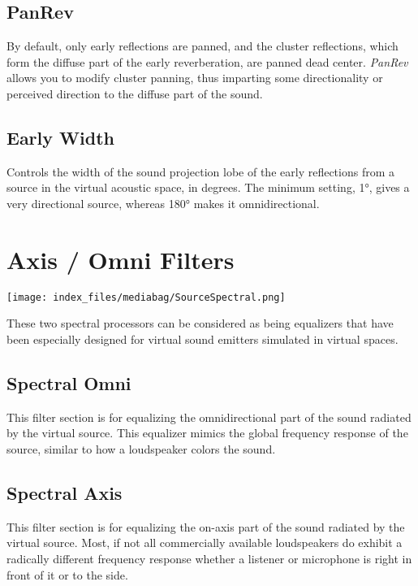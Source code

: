 \documentclass[
  letterpaper,
  DIV=11,
  numbers=noendperiod]{scrreport}
\begin{document}
\hypertarget{panrev}{%
\subsection{PanRev}\label{panrev}}

By default, only early reflections are panned, and the cluster
reflections, which form the diffuse part of the early reverberation, are
panned dead center. \emph{PanRev} allows you to modify cluster panning,
thus imparting some directionality or perceived direction to the diffuse
part of the sound.

\hypertarget{early-width}{%
\subsection{Early Width}\label{early-width}}

Controls the width of the sound projection lobe of the early reflections
from a source in the virtual acoustic space, in degrees. The minimum
setting, 1°, gives a very directional source, whereas 180° makes it
omnidirectional.

\hypertarget{axis-omni-filters}{%
\section{Axis / Omni Filters}\label{axis-omni-filters}}

\texttt{[image: index\_files/mediabag/SourceSpectral.png]}

These two spectral processors can be considered as being equalizers that
have been especially designed for virtual sound emitters simulated in
virtual spaces.

\hypertarget{spectral-omni}{%
\subsection{Spectral Omni}\label{spectral-omni}}

This filter section is for equalizing the omnidirectional part of the
sound radiated by the virtual source. This equalizer mimics the global
frequency response of the source, similar to how a loudspeaker colors
the sound.

\hypertarget{spectral-axis}{%
\subsection{Spectral Axis}\label{spectral-axis}}

This filter section is for equalizing the on-axis part of the sound
radiated by the virtual source. Most, if not all commercially available
loudspeakers do exhibit a radically different frequency response whether
a listener or microphone is right in front of it or to the side.
\end{document}
